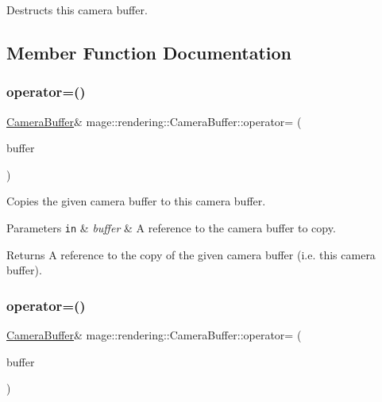 Destructs this camera buffer. 

\subsection{Member Function Documentation}
\mbox{\label{structmage_1_1rendering_1_1_camera_buffer_a5c0b3a1e054ebcb4597f313c0346da57}} 
\subsubsection{\texorpdfstring{operator=()}{operator=()}\hspace{0.1cm}{\footnotesize\ttfamily [1/2]}}
{\footnotesize\ttfamily \mbox{\hyperlink{structmage_1_1rendering_1_1_camera_buffer}{Camera\+Buffer}}\& mage\+::rendering\+::\+Camera\+Buffer\+::operator= (\begin{DoxyParamCaption}\item[{const \mbox{\hyperlink{structmage_1_1rendering_1_1_camera_buffer}{Camera\+Buffer}} \&}]{buffer }\end{DoxyParamCaption})\hspace{0.3cm}{\ttfamily [default]}}

Copies the given camera buffer to this camera buffer.


\begin{DoxyParams}[1]{Parameters}
\mbox{\tt in}  & {\em buffer} & A reference to the camera buffer to copy. \\
\hline
\end{DoxyParams}
\begin{DoxyReturn}{Returns}
A reference to the copy of the given camera buffer (i.\+e. this camera buffer). 
\end{DoxyReturn}
\mbox{\label{structmage_1_1rendering_1_1_camera_buffer_a12658ff989daac2e910b91633ac0223d}} 
\subsubsection{\texorpdfstring{operator=()}{operator=()}\hspace{0.1cm}{\footnotesize\ttfamily [2/2]}}
{\footnotesize\ttfamily \mbox{\hyperlink{structmage_1_1rendering_1_1_camera_buffer}{Camera\+Buffer}}\& mage\+::rendering\+::\+Camera\+Buffer\+::operator= (\begin{DoxyParamCaption}\item[{\mbox{\hyperlink{structmage_1_1rendering_1_1_camera_buffer}{Camera\+Buffer}} \&\&}]{buffer }\end{DoxyParamCaption})\hspace{0.3cm}{\ttfamily [default]}}

